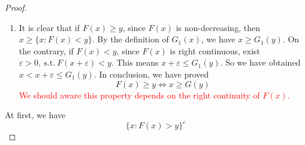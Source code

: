 \documentclass[11pt]{article}
\renewcommand{\(}{\left(}%
\renewcommand{\)}{\right)}%
\renewcommand{\[}{\left[}%
\renewcommand{\]}{\right]}%
\newcommand{\st}{\mathrm{\ s.t.\ }}
\newtheorem{proof}{Proof.}}
\begin{document}
\begin{proof}
\begin{enumerate}[\itshape (1)]
   
   
    \item It is clear that if $F(x)\geq y$, since $F(x)$ is non-decreasing, then $x\geq \{x:F(x)< y\}$. By the definition of $G_1(x)$, we have $x\geq G_1(y).$ On the contrary, if $F(x)<y$, since $F(x)$ is right continuous, exist $\varepsilon>0,\st F(x+\varepsilon )<y$. This means $x+\varepsilon\leq G_1(y)$. So we have obtained $x<x+\varepsilon \leq G_1(y)$. In conclusion, we have proved
    \begin{equation*}
     F(x)\geq y\Leftrightarrow x\geq G(y)
    \end{equation*}
    \textcolor{red}{We should aware this property depends on the right continuity of $F(x)$.}
   \end{enumerate}
   
   
    
   
   At first, we have
   \begin{equation*}
    \{x:F(x)> y\}^c
   \end{equation*}
  \end{proof}
\end{document}
